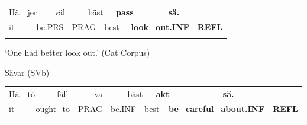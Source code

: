 \begin{tabular}{llllllllllll}
\lsptoprule
Hä & \multicolumn{2}{l}{jer

} & \multicolumn{2}{l}{väl

} & \multicolumn{2}{l}{bäst

} & \multicolumn{2}{l}{{\bfseries pass}

} & \multicolumn{2}{l}{{\bfseries sä.}

} & \\
\multicolumn{2}{l}{it

} & \multicolumn{2}{l}{be.PRS

} & \multicolumn{2}{l}{PRAG

} & \multicolumn{2}{l}{best

} & \multicolumn{2}{l}{{\bfseries look\_out.INF}

} & \multicolumn{2}{l}{{\bfseries REFL}

}\\
\lspbottomrule
\end{tabular}

\begin{styleTranslation}
‘One had better look out.’ (Cat Corpus)

\end{styleTranslation}

\begin{listWWNumileveli}
\item 

\begin{styleExample}
Sävar (SVb)

\end{styleExample}

\end{listWWNumileveli}

\begin{tabular}{llllllllllllll}
\lsptoprule
Hä & \multicolumn{2}{l}{tö

} & \multicolumn{2}{l}{fäll

} & \multicolumn{2}{l}{va

} & \multicolumn{2}{l}{bäst

} & \multicolumn{2}{l}{{\bfseries akt}

} & \multicolumn{2}{l}{{\bfseries sä.}

} & \\
\multicolumn{2}{l}{it

} & \multicolumn{2}{l}{ought\_to

} & \multicolumn{2}{l}{PRAG

} & \multicolumn{2}{l}{be.INF

} & \multicolumn{2}{l}{best

} & \multicolumn{2}{l}{{\bfseries be\_careful\_about.INF}

} & \multicolumn{2}{l}{{\bfseries REFL}

}\\
\lspbottomrule
\end{tabular}

